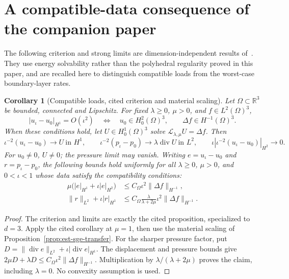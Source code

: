 \documentclass[11pt,a4paper]{article}
\newtheorem{corollary}[theorem]{Corollary}
\theoremstyle{remark}
\numberwithin{equation}{section}
\begin{document}
\section{A compatible-data consequence of the companion paper}
\label{comp:section}

The following criterion and strong limits are dimension-independent
results of~\cite[Corollary~3.7 and Proposition~3.9]{PolygonCompanion2026}.
They use energy solvability rather than the polyhedral regularity
proved in this paper, and are recalled here to distinguish compatible
loads from the worst-case boundary-layer rates.

\begin{corollary}[Compatible loads, cited criterion and material scaling]
\label{comp:criterion}
Let \(\Omega\subset\mathbb R^3\) be bounded, connected and Lipschitz.
For fixed \(\lambda\ge0\), \(\mu>0\), and \(f\in L^2(\Omega)^3\),
\[
 |u_\iota-u_0|_{H^1}=O(\iota^2)
 \quad\Longleftrightarrow\quad
 u_0\in H^2_0(\Omega)^3,\qquad \Delta f\in H^{-1}(\Omega)^3.
\]
When these conditions hold, let
\(U\in H^1_0(\Omega)^3\) solve
\(\mathcal L_{\lambda,\mu}U=\Delta f\). Then
\[
 \iota^{-2}(u_\iota-u_0)\to U\ \text{in }H^1,\qquad
 \iota^{-2}(p_\iota-p_0)\to\lambda\operatorname{div}U\ \text{in }L^2,
 \qquad \iota|\iota^{-2}(u_\iota-u_0)|_{H^2}\to0.
\]
For \(u_0\ne0\), \(U\ne0\); the pressure limit may vanish.
Writing \(e=u_\iota-u_0\) and \(r=p_\iota-p_0\), the following bounds
hold uniformly for all \(\lambda\ge0\), \(\mu>0\), and \(0<\iota<1\)
whose data satisfy the compatibility conditions:
\begin{align}
 \mu\bigl(|e|_{H^1}+\iota|e|_{H^2}\bigr)
 &\le C_\Omega\iota^2\|\Delta f\|_{H^{-1}},\\
 \|r\|_{L^2}+\iota|r|_{H^1}
 &\le C_\Omega\frac{\lambda}{\lambda+2\mu}
          \iota^2\|\Delta f\|_{H^{-1}}.
\end{align}
\end{corollary}
\begin{proof}
The criterion and limits are exactly the cited proposition, specialized
to \(d=3\). Apply the cited corollary at \(\mu=1\), then use the
material scaling of Proposition~\ref{prop:est-sge-transfer}.
For the sharper pressure factor, put
\(D=\|\operatorname{div}e\|_{L^2}+\iota|\operatorname{div}e|_{H^1}\).
The displacement and pressure bounds give
\(2\mu D+\lambda D\le C_\Omega\iota^2\|\Delta f\|_{H^{-1}}\).
Multiplication by \(\lambda/(\lambda+2\mu)\) proves the claim,
including \(\lambda=0\). No convexity assumption is used.
\end{proof}



\end{document}

